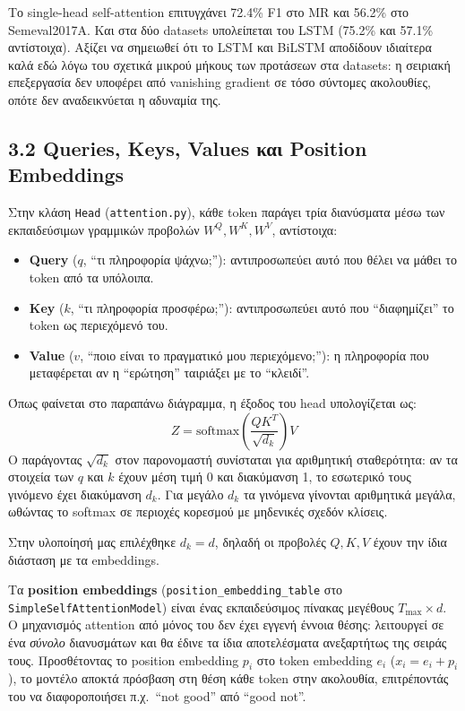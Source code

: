 \documentclass[12pt]{article}
\begin{document}


Το single-head self-attention επιτυγχάνει 72.4\% F1 στο MR και
56.2\% στο Semeval2017A. Και στα δύο datasets υπολείπεται του LSTM
(75.2\% και 57.1\% αντίστοιχα). Αξίζει να σημειωθεί ότι το
LSTM και BiLSTM αποδίδουν ιδιαίτερα καλά εδώ λόγω του σχετικά μικρού
μήκους των προτάσεων στα datasets: η σειριακή επεξεργασία δεν υποφέρει
από vanishing gradient σε τόσο σύντομες ακολουθίες, οπότε δεν
αναδεικνύεται η αδυναμία της.

\subsection{3.2 Queries, Keys, Values και Position Embeddings}

Στην κλάση \texttt{Head} (\texttt{attention.py}), κάθε token παράγει
τρία διανύσματα μέσω των εκπαιδεύσιμων γραμμικών προβολών $W^Q, W^K, W^V$, αντίστοιχα:

\begin{itemize}
    \item \textbf{Query} ($q$, ``τι πληροφορία ψάχνω;''): αντιπροσωπεύει
    αυτό που θέλει να μάθει το token από τα υπόλοιπα.
    \item \textbf{Key} ($k$, ``τι πληροφορία προσφέρω;''): αντιπροσωπεύει
    αυτό που ``διαφημίζει'' το token ως περιεχόμενό του.
    \item \textbf{Value} ($v$, ``ποιο είναι το πραγματικό μου περιεχόμενο;''):
    η πληροφορία που μεταφέρεται αν η ``ερώτηση'' ταιριάξει με το ``κλειδί''.
\end{itemize}

\medskip
Όπως φαίνεται στο παραπάνω διάγραμμα, η έξοδος του head υπολογίζεται ως:
\[
    Z = \text{softmax}\!\left(\frac{QK^T}{\sqrt{d_k}}\right) V
\]
Ο παράγοντας $\sqrt{d_k}$ στον παρονομαστή συνίσταται για αριθμητική
σταθερότητα: αν τα στοιχεία των $q$ και $k$ έχουν μέση τιμή 0 και διακύμανση 1,
το εσωτερικό τους γινόμενο έχει διακύμανση $d_k$.
Για μεγάλο $d_k$ τα γινόμενα γίνονται αριθμητικά μεγάλα, ωθώντας το softmax
σε περιοχές κορεσμού με μηδενικές σχεδόν κλίσεις.

Στην υλοποίησή μας επιλέχθηκε $d_k = d$, δηλαδή οι προβολές $Q, K, V$
έχουν την ίδια διάσταση με τα embeddings.

\medskip
Τα \textbf{position embeddings} (\texttt{position\_embedding\_table}
στο \texttt{SimpleSelfAttentionModel}) είναι ένας εκπαιδεύσιμος πίνακας
μεγέθους $T_{\max} \times d$. Ο μηχανισμός attention από μόνος του
δεν έχει εγγενή έννοια θέσης: λειτουργεί σε ένα \emph{σύνολο}
διανυσμάτων και θα έδινε τα ίδια αποτελέσματα ανεξαρτήτως της
σειράς τους. Προσθέτοντας το position embedding $p_i$ στο token
embedding $e_i$ ($x_i = e_i + p_i$), το μοντέλο αποκτά πρόσβαση
στη θέση κάθε token στην ακολουθία, επιτρέποντάς του να διαφοροποιήσει
π.χ.\ ``not good'' από ``good not''.
\end{document}
